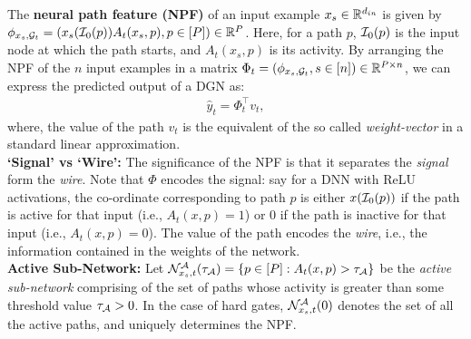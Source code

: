 The \textbf{neural path feature (NPF)} of an input example $x_s\in \mathbb{R}^{d_{in}}$ is given by $\phi_{x_s,\mathcal{G}_t}=(x_s(\mathcal{I}_0(p))A_t(x_s,p) ,p\in[P])\in\mathbb{R}^P$. Here, for a path $p$, $\mathcal{I}_0(p)$ is the input node at which the path starts, and $A_t(x_s,p)$ is its activity. By arranging the NPF of the $n$ input examples in a matrix $\Phi_t=(\phi_{x_s,\mathcal{G}_t},s\in[n])\in\mathbb{R}^{P\times n}$, we can express the predicted output of a DGN as: 
\begin{align}\label{eq:npfbasic}
\hat{y}_t=\Phi_t^\top v_t,
\end{align}
where, the value of the path $v_t$ is the equivalent of the so called \emph{weight-vector} in a standard linear approximation. \\
\textbf{`Signal' vs `Wire': }The significance of the NPF is that it separates the \emph{signal} form the \emph{wire}. Note that $\Phi$ encodes the signal: say for a DNN with ReLU activations, the co-ordinate corresponding to path $p$ is either $x(\mathcal{I}_0(p))$ if the path is active for that input (i.e., $A_t(x,p)=1$) or $0$ if the path is inactive for that input  (i.e., $A_t(x,p)=0$). The value of the path encodes the \emph{wire}, i.e., the information contained in the weights of the network.\\
\textbf{Active Sub-Network:} Let $\mathcal{N}^{\mathcal{A}}_{x_s,t}(\tau_{\mathcal{A}})=\{p\in[P]:A_t(x,p)>\tau_{\mathcal{A}}\}$ be the \emph{active sub-network} comprising of the set of paths whose activity is greater than some threshold value $\tau_{\mathcal{A}}>0$. In the case of hard gates, $\mathcal{N}^{\mathcal{A}}_{x_s,t}(0)$ denotes the set of all the active paths, and uniquely determines the NPF.\\

